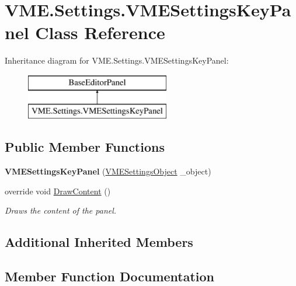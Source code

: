 \hypertarget{class_v_m_e_1_1_settings_1_1_v_m_e_settings_key_panel}{}\section{V\+M\+E.\+Settings.\+V\+M\+E\+Settings\+Key\+Panel Class Reference}
\label{class_v_m_e_1_1_settings_1_1_v_m_e_settings_key_panel}
Inheritance diagram for V\+M\+E.\+Settings.\+V\+M\+E\+Settings\+Key\+Panel\+:\begin{figure}[H]
\begin{center}
\leavevmode
\includegraphics[height=2.000000cm]{class_v_m_e_1_1_settings_1_1_v_m_e_settings_key_panel}
\end{center}
\end{figure}
\subsection*{Public Member Functions}
\begin{DoxyCompactItemize}
\item 
{\bfseries V\+M\+E\+Settings\+Key\+Panel} (\hyperlink{class_v_m_e_settings_object}{V\+M\+E\+Settings\+Object} \+\_\+object)\hypertarget{class_v_m_e_1_1_settings_1_1_v_m_e_settings_key_panel_a28ab72df27950080ca08aa88af7f9b69}{}\label{class_v_m_e_1_1_settings_1_1_v_m_e_settings_key_panel_a28ab72df27950080ca08aa88af7f9b69}

\item 
override void \hyperlink{class_v_m_e_1_1_settings_1_1_v_m_e_settings_key_panel_a37a1629cea9d0dedcc887d52d54b036c}{Draw\+Content} ()
\begin{DoxyCompactList}\small\item\em Draws the content of the panel. \end{DoxyCompactList}\end{DoxyCompactItemize}
\subsection*{Additional Inherited Members}


\subsection{Member Function Documentation}
